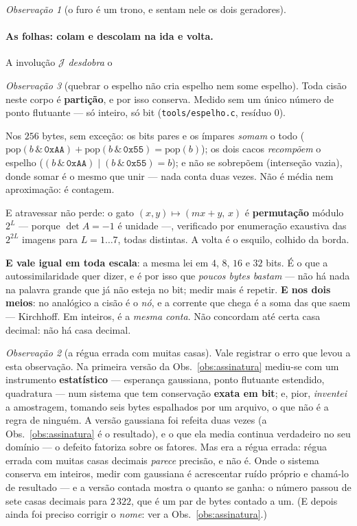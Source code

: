 \documentclass[11pt]{article}
\newcommand{\code}[1]{\texttt{\small #1}}
\theoremstyle{plain}
\theoremstyle{remark}
\newtheorem{obs}{Observação}
\begin{document}
\begin{obs}[o furo é um trono, e sentam nele os dois geradores]
\paragraph{As folhas: colam e descolam na ida e volta.} A involução $\mathcal J$ \emph{desdobra} o

\end{obs}




\begin{obs}[quebrar o espelho não cria espelho nem some espelho]\label{obs:espelho}
Toda cisão neste corpo é \textbf{partição}, e por isso conserva. Medido sem um único número de ponto
flutuante --- só inteiro, só bit (\code{tools/espelho.c}, resíduo $0$).

Nos $256$ bytes, sem exceção: os bits pares e os ímpares \emph{somam} o todo
($\mathrm{pop}(b\,\&\,\mathtt{0xAA})+\mathrm{pop}(b\,\&\,\mathtt{0x55})=\mathrm{pop}(b)$); os dois
cacos \emph{recompõem} o espelho ($(b\,\&\,\mathtt{0xAA})\mid(b\,\&\,\mathtt{0x55})=b$); e não se
sobrepõem (interseção vazia), donde somar é o mesmo que unir --- nada conta duas vezes. Não é média
nem aproximação: é contagem.

E atravessar não perde: o gato $(x,y)\mapsto(mx+y,\,x)$ é \textbf{permutação} módulo $2^L$ --- porque
$\det A=-1$ é unidade ---, verificado por enumeração exaustiva das $2^{2L}$ imagens para
$L=1\ldots7$, todas distintas. A volta é o esquilo, colhido da borda.

\textbf{E vale igual em toda escala}: a mesma lei em $4$, $8$, $16$ e $32$ bits. É o que a
autossimilaridade quer dizer, e é por isso que \emph{poucos bytes bastam} --- não há nada na palavra
grande que já não esteja no bit; medir mais é repetir. \textbf{E nos dois meios}: no analógico a
cisão é o \emph{nó}, e a corrente que chega é a soma das que saem --- Kirchhoff. Em inteiros, é a
\emph{mesma conta}. Não concordam até certa casa decimal: não há casa decimal.

\begin{obs}[a régua errada com muitas casas]
Vale registrar o erro que levou a esta observação. Na primeira versão da Obs.~\ref{obs:assinatura} mediu-se com um
instrumento \textbf{estatístico} --- esperança gaussiana, ponto flutuante estendido, quadratura ---
num sistema que tem conservação \textbf{exata em bit}; e, pior, \emph{inventei} a amostragem, tomando
seis bytes espalhados por um arquivo, o que não é a regra de ninguém. A versão gaussiana foi refeita duas vezes (a Obs.~\ref{obs:assinatura} é
o resultado), e o que ela media continua verdadeiro no seu domínio --- o defeito fatoriza sobre os
fatores. Mas era a régua errada: régua errada com muitas casas decimais \emph{parece} precisão, e não
é. Onde o sistema conserva em inteiros, medir com gaussiana é acrescentar ruído próprio e chamá-lo de
resultado --- e a versão contada mostra o quanto se ganha: o número passou de sete casas decimais
para $2\,322$, que é um par de bytes contado a um. (E depois ainda foi preciso corrigir o \emph{nome}:
ver a Obs.~\ref{obs:assinatura}.)
\end{obs}
\end{obs}
\end{document}
